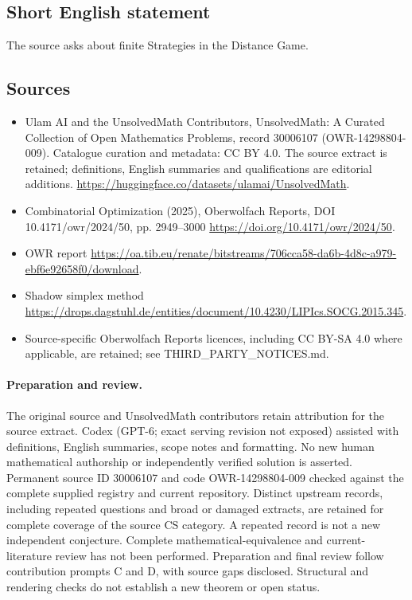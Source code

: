 \documentclass[11pt]{article}
\begin{document}
\subsection{Short English statement}
The source asks about finite Strategies in the Distance Game.
\subsection{Sources}
\begin{itemize}
\item[\hypertarget{source:30006107:1}{S1}] Ulam AI and the UnsolvedMath Contributors, UnsolvedMath: A Curated Collection of Open Mathematics Problems, record 30006107 (OWR-14298804-009). Catalogue curation and metadata: CC BY 4.0. The source extract is retained; definitions, English summaries and qualifications are editorial additions.
\url{https://huggingface.co/datasets/ulamai/UnsolvedMath}.
\item[\hypertarget{source:30006107:2}{S2}] Combinatorial Optimization (2025), Oberwolfach Reports, DOI 10.4171/owr/2024/50, pp. 2949--3000
\url{https://doi.org/10.4171/owr/2024/50}.
\item[\hypertarget{source:30006107:3}{S3}] OWR report
\url{https://oa.tib.eu/renate/bitstreams/706cca58-da6b-4d8c-a979-ebf6e92658f0/download}.
\item[\hypertarget{source:30006107:4}{S4}] Shadow simplex method
\url{https://drops.dagstuhl.de/entities/document/10.4230/LIPIcs.SOCG.2015.345}.
\item Source-specific Oberwolfach Reports licences, including CC BY-SA 4.0 where applicable, are retained; see THIRD\_PARTY\_NOTICES.md.
\end{itemize}
\paragraph{Preparation and review.}
The original source and UnsolvedMath contributors retain attribution for the source extract. Codex (GPT-6; exact serving revision not exposed) assisted with definitions, English summaries, scope notes and formatting. No new human mathematical authorship or independently verified solution is asserted. Permanent source ID 30006107 and code OWR-14298804-009 checked against the complete supplied registry and current repository. Distinct upstream records, including repeated questions and broad or damaged extracts, are retained for complete coverage of the source CS category. A repeated record is not a new independent conjecture. Complete mathematical-equivalence and current-literature review has not been performed. Preparation and final review follow contribution prompts C and D, with source gaps disclosed. Structural and rendering checks do not establish a new theorem or open status.
\label{end:30006107}
\end{document}
